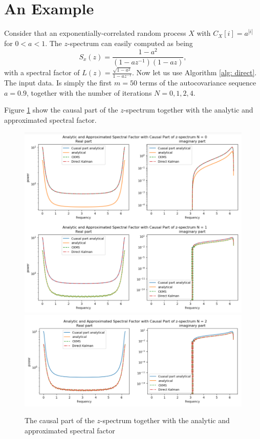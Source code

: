 \documentclass[12pt]{amsart}
\begin{document}
\section{An Example}
\label{sec: Example}

Consider that an exponentially-correlated random process $X$ with $C_X[i] = a^{|i|}$ for $0<a<1$. The $z$-spectrum can easily computed as being $$S_x(z) = \frac{1 - a^2}{(1-az^{-1})(1-az)},$$ with a spectral factor of $L(z) = \frac{\sqrt{1-a^2}}{1-az^{-1}}$. Now let us use Algorithm \ref{alg: direct}. The input data. Is simply the first $m=50$ terms of the autocovariance sequence $a=0.9$, together with the number of iterations $N = 0,1,2,4$. 

Figure \ref{fig: Ex1} show the causal part of the $z$-spectrum together with the analytic and approximated spectral factor. 

\begin{figure}
	\caption{The causal part of the $z$-spectrum together with the analytic and approximated spectral factor}
	\label{fig: Ex1}
	\includegraphics[scale=.8]{Example1N=0and1.png}
	\includegraphics[scale=.8]{Example1N=2.png}
\end{figure}
\end{document}
